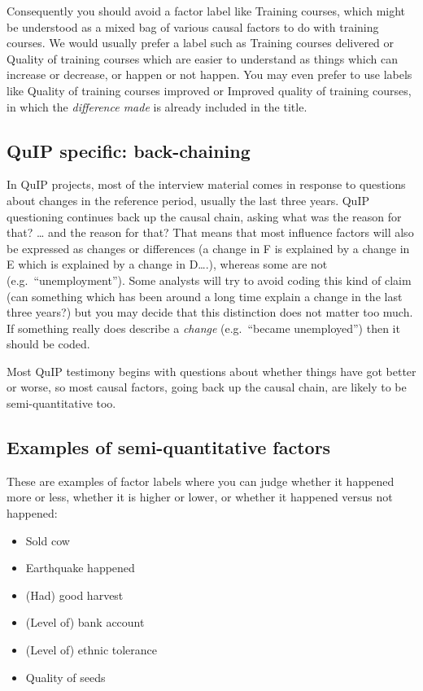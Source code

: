 \documentclass[
]{book}
\providecommand{\tightlist}{%
  \setlength{\itemsep}{0pt}\setlength{\parskip}{0pt}}
\begin{document}
Consequently you should avoid a factor label like Training courses, which might be understood as a mixed bag of various causal factors to do with training courses. We would usually prefer a label such as Training courses delivered or Quality of training courses which are easier to understand as things which can increase or decrease, or happen or not happen. You may even prefer to use labels like Quality of training courses improved or Improved quality of training courses, in which the \emph{difference made} is already included in the title.

\hypertarget{quip-specific-back-chaining}{%
\subsection{QuIP specific: back-chaining}\label{quip-specific-back-chaining}}

In QuIP projects, most of the interview material comes in response to questions about changes in the reference period, usually the last three years. QuIP questioning continues back up the causal chain, asking what was the reason for that? \ldots{} and the reason for that? That means that most influence factors will also be expressed as changes or differences (a change in F is explained by a change in E which is explained by a change in D\ldots.), whereas some are not (e.g.~``unemployment''). Some analysts will try to avoid coding this kind of claim (can something which has been around a long time explain a change in the last three years?) but you may decide that this distinction does not matter too much. If something really does describe a \emph{change} (e.g.~``became unemployed'') then it should be coded.

Most QuIP testimony begins with questions about whether things have got better or worse, so most causal factors, going back up the causal chain, are likely to be semi-quantitative too.

\hypertarget{examples-of-semi-quantitative-factors}{%
\subsection{Examples of semi-quantitative factors}\label{examples-of-semi-quantitative-factors}}

These are examples of factor labels where you can judge whether it happened more or less, whether it is higher or lower, or whether it happened versus not happened:

\begin{itemize}
\tightlist
\item
  Sold cow
\item
  Earthquake happened
\item
  (Had) good harvest
\item
  (Level of) bank account
\item
  (Level of) ethnic tolerance
\item
  Quality of seeds
\end{itemize}
\end{document}
